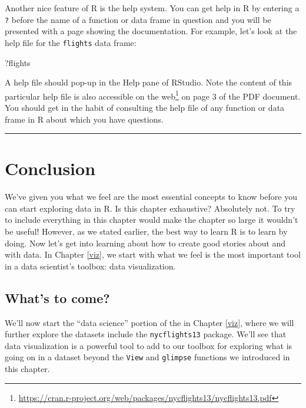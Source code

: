 \documentclass[12pt,]{krantz}
\makeatletter
\newenvironment{Shaded}{\begin{snugshade}}{\end{snugshade}}
\newcommand{\NormalTok}[1]{#1}
\renewcommand{\href}[2]{#2\footnote{\url{#1}}}
\newenvironment{kframe}{%
\medskip{}
\setlength{\fboxsep}{.8em}
 \def\at@end@of@kframe{}%
 \ifinner\ifhmode%
  \def\at@end@of@kframe{\end{minipage}}%
  \begin{minipage}{\columnwidth}%
 \fi\fi%
 \def\FrameCommand##1{\hskip\@totalleftmargin \hskip-\fboxsep
 \colorbox{shadecolor}{##1}\hskip-\fboxsep
     \hskip-\linewidth \hskip-\@totalleftmargin \hskip\columnwidth}%
 \MakeFramed {\advance\hsize-\width
   \@totalleftmargin\z@ \linewidth\hsize
   \@setminipage}}%
 {\par\unskip\endMakeFramed%
 \at@end@of@kframe}
\renewenvironment{Shaded}{\begin{kframe}}{\end{kframe}}
\theoremstyle{definition}
\theoremstyle{definition}
\theoremstyle{definition}
\theoremstyle{remark}
\makeatother
\begin{document}
Another nice feature of R is the help system. You can get help in R by
entering a \texttt{?} before the name of a function or data frame in
question and you will be presented with a page showing the
documentation. For example, let's look at the help file for the
\texttt{flights} data frame:

\begin{Shaded}
\begin{Highlighting}[]
\NormalTok{?flights}
\end{Highlighting}
\end{Shaded}

A help file should pop-up in the Help pane of RStudio. Note the content
of this particular help file is also accessible on the
\href{https://cran.r-project.org/web/packages/nycflights13/nycflights13.pdf}{web}
on page 3 of the PDF document. You should get in the habit of consulting
the help file of any function or data frame in R about which you have
questions.

\begin{center}\rule{0.5\linewidth}{\linethickness}\end{center}

\section{Conclusion}\label{conclusion}

We've given you what we feel are the most essential concepts to know
before you can start exploring data in R. Is this chapter exhaustive?
Absolutely not. To try to include everything in this chapter would make
the chapter so large it wouldn't be useful! However, as we stated
earlier, the best way to learn R is to learn by doing. Now let's get
into learning about how to create good stories about and with data. In
Chapter \ref{viz}, we start with what we feel is the most important tool
in a data scientist's toolbox: data visualization.

\subsection{What's to come?}\label{whats-to-come}

We'll now start the ``data science'' portion of the in Chapter
\ref{viz}, where we will further explore the datasets include the
\texttt{nycflights13} package. We'll see that data visualization is a
powerful tool to add to our toolbox for exploring what is going on in a
dataset beyond the \texttt{View} and \texttt{glimpse} functions we
introduced in this chapter.
\end{document}
